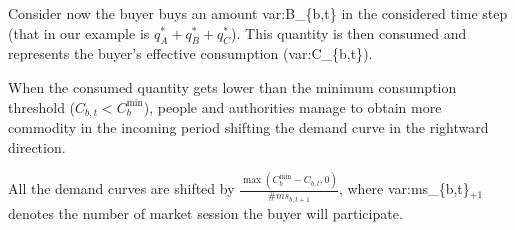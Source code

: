 \documentclass{article}
\begin{document}
Consider now the buyer buys an amount \gls{var:B_{b,t}}  in the considered time step (that in our example is $q^*_A+q^*_B+q^*_C$).
This quantity is then consumed and represents the buyer's effective consumption (\gls{var:C_{b,t}}).

When the consumed quantity gets lower than the minimum consumption threshold ($C_{b,t}<C^{\min}_b$), people and authorities manage to obtain more commodity in the incoming period shifting the demand curve in the rightward direction.

All the demand curves are shifted by $\frac{\max(C^{\min}_b-C_{b,t},0)}{\#ms_{b,t+1}}$, where \gls{var:ms_{b,t}}$_{+1}$ denotes the number of market session the buyer will participate.


%
%
%
%
%
%
%
%
%
%
\end{document}
